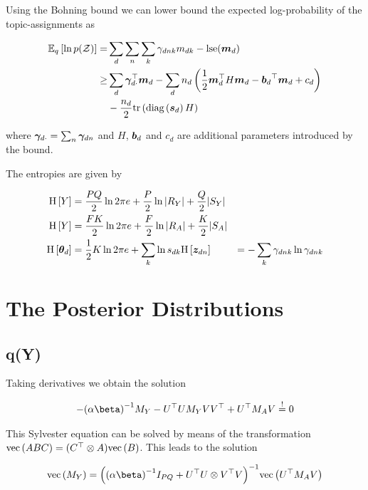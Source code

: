 Using the Bohning bound\cite{Bohning1988} we can lower bound the expected log-probability of the topic-assignments as

\begin{equation}
\begin{split}
\ex{\ln p(\mathcal{Z})}{q} 
     = & \sum_d \sum_n \sum_k \gdnk m_{dk} - \lse(\md) \\
    \geq & \sum_d \vv{\gamma}_{d\cdot}\T \md
      - \sum_d n_d \left( \half \md\T H \md  - \bd \T \md + c_d \right) \\
      & - \halve{n_d} \Tr{\diag{\vv{s}_d}H}
\end{split}
\end{equation}

where $\vv{\gamma}_{d\cdot} = \sum_n \gdn$ and $H$, $\vv{b}_d$ and $c_d$ are additional parameters introduced by the bound.

The entropies are given by

\begin{align}
\ent{Y} &= \halve{PQ} \ln 2 \pi e + \halve{P}\ln |R_Y| + \halve{Q} |S_Y| \\
\ent{Y} &= \halve{FK} \ln 2 \pi e + \halve{F}\ln |R_A| + \halve{K} |S_A| \\
\ent{\thd} &= \half{K} \ln 2 \pi e + \sum_k \ln s_{dk}
\ent{\zdn} &= -\sum_k \gdnk \ln \gdnk
\end{align}



\section{The Posterior Distributions}

\subsection{q(Y)}
Taking derivatives we obtain the solution

\begin{align}
-\invb{\alpha \beta} M_Y - U\T U M_Y V V\T + U\T M_A V \mbeq 0
\end{align}

This Sylvester equation can be solved by means of the transformation $\vecf{ABC} = (C\T \otimes A)\vecf{B}$. This leads to the solution

\begin{align}
\vecf{M_Y} = \invb{\invb{\alpha \beta} I_{PQ} + U\T U \otimes V\T V}\vecf{U\T M_A V} \label{eqn:dumb-y-soln}
\end{align}


